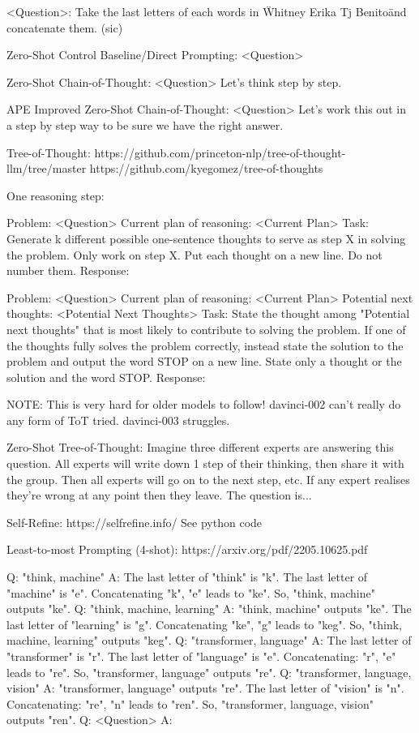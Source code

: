 \documentclass[11pt]{article}
\begin{document}
<Question>: Take the last letters of each words in \"Whitney Erika Tj Benito\" and concatenate them. (sic)

Zero-Shot Control Baseline/Direct Prompting:
<Question>

Zero-Shot Chain-of-Thought:
<Question>
Let's think step by step.

APE Improved Zero-Shot Chain-of-Thought:
<Question>
Let's work this out in a step by step way to be sure we have the right answer.

Tree-of-Thought: https://github.com/princeton-nlp/tree-of-thought-llm/tree/master https://github.com/kyegomez/tree-of-thoughts

One reasoning step:

Problem:
<Question> 
Current plan of reasoning:
<Current Plan>
Task:
Generate {k} different possible one-sentence thoughts to serve as step {X} in solving the problem. Only work on step {X}. Put each thought on a new line. Do not number them.
Response:

Problem:
<Question> 
Current plan of reasoning:
<Current Plan>
Potential next thoughts:
<Potential Next Thoughts>
Task:
State the thought among "Potential next thoughts" that is most likely to contribute to solving the problem. If one of the thoughts fully solves the problem correctly, instead state the solution to the problem and output the word STOP on a new line. State only a thought or the solution and the word STOP.
Response:

NOTE: This is very hard for older models to follow! davinci-002 can't really do any form of ToT tried. davinci-003 struggles.

Zero-Shot Tree-of-Thought:
Imagine three different experts are answering this question.
All experts will write down 1 step of their thinking,
then share it with the group.
Then all experts will go on to the next step, etc.
If any expert realises they're wrong at any point then they leave.
The question is...

Self-Refine: https://selfrefine.info/
See python code

Least-to-most Prompting (4-shot): https://arxiv.org/pdf/2205.10625.pdf

Q: "think, machine"
A: The last letter of "think" is "k". The last letter of "machine" is "e". Concatenating "k", "e" leads to
"ke". So, "think, machine" outputs "ke".
Q: "think, machine, learning"
A: "think, machine" outputs "ke". The last letter of "learning" is "g". Concatenating "ke", "g" leads to
"keg". So, "think, machine, learning" outputs "keg".
Q: "transformer, language"
A: The last letter of "transformer" is "r". The last letter of "language" is "e". Concatenating: "r", "e"
leads to "re". So, "transformer, language" outputs "re".
Q: "transformer, language, vision"
A: "transformer, language" outputs "re". The last letter of "vision" is "n". Concatenating: "re", "n" leads
to "ren". So, "transformer, language, vision" outputs "ren".
Q: <Question>
A: 
\end{document}
